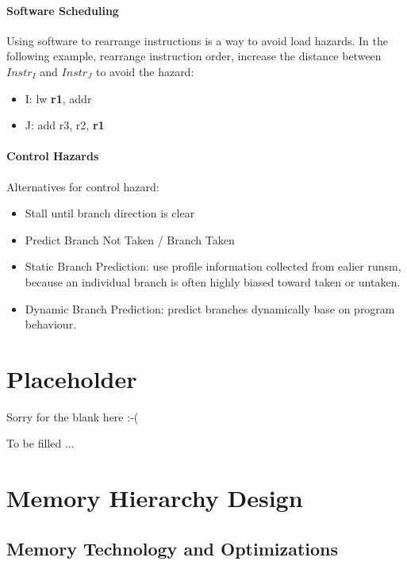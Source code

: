 \documentclass[12pt, a4paper]{article}
\theoremstyle{margin}
\begin{document}
	  \paragraph{Software Scheduling}
	  Using software to rearrange instructions is a way to avoid load hazards. In the following example, rearrange instruction order, increase the distance between $Instr_I$ and $Instr_J$ to avoid the hazard:\\
	  \begin{itemize}
		\item I: lw \textbf{r1}, addr
		\item J: add r3, r2, \textbf{r1}
	  \end{itemize}

	  \paragraph{Control Hazards} Alternatives for control hazard\cite{caqa}:
	  \begin{itemize}
		\item Stall until branch direction is clear
		\item Predict Branch Not Taken / Branch Taken
		\item Static Branch Prediction: 
		use profile information collected from ealier runsm, because an individual branch is often highly biased toward taken or untaken.
		\item Dynamic Branch Prediction: 
		predict branches dynamically base on  program behaviour.
	  \end{itemize}

\section{Placeholder}
Sorry for the blank here :-(

To be filled ...

\section{Memory Hierarchy Design}
  \subsection{Memory Technology and Optimizations}
\end{document}

